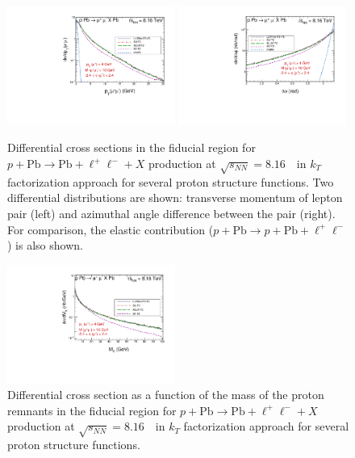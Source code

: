 \begin{figure}[!h]
\includegraphics[width=0.49\textwidth]{figures_Marta/pt-sum-l.pdf}
 \includegraphics[width=0.49\textwidth]{figures_Marta/phi-l.pdf}
\caption{Differential cross sections in the fiducial region for $p+\textrm{Pb}\rightarrow \textrm{Pb} + \ell^+\ell^- + X$ production at $\sqrt{s_{N N}} = 8.16$~\TeV\ in $k_T$ factorization approach for several proton structure functions.
Two differential distributions are shown: transverse momentum of lepton pair (left) and azimuthal angle difference between the pair (right).
For comparison, the elastic contribution ($p+\textrm{Pb}\rightarrow p+ \textrm{Pb} + \ell^+\ell^-$) is also shown.
}
 \label{fig:kt_figures2}
\end{figure}


\begin{figure}[!h]

 \includegraphics[width=0.49\textwidth]{figures_Marta/MX-l.pdf}
\caption{Differential cross section as a function of the mass of the proton remnants in the fiducial region for $p+\textrm{Pb}\rightarrow \textrm{Pb} + \ell^+\ell^- + X$ production at $\sqrt{s_{N N}} = 8.16$~\TeV\ in $k_T$ factorization approach for several proton structure functions.
}
 \label{fig:kt_figures3}
\end{figure}





